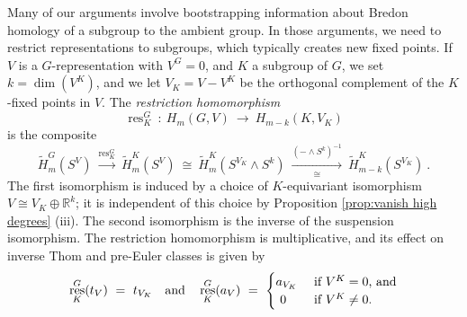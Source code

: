 \documentclass{amsart}[12pt]
\DeclareMathOperator{\res}{res}
\newcommand{\mR}{{\mathbb R}}
\newcommand{\iso}{\cong}
\newcommand{\sm}{\wedge}
\newcommand{\xra}{\xrightarrow}
\renewcommand{\to}{\longrightarrow}
\numberwithin{equation}{section}
\theoremstyle{definition}
\begin{document}
Many of our arguments involve bootstrapping information about Bredon homology
of a subgroup to the ambient group.
In those arguments, we need to restrict representations to subgroups,
which typically creates new fixed points.
If $V$ is a $G$-representation with $V^G=0$, and $K$ a subgroup of $G$, 
we set $k=\dim(V^K)$, and we let $V_K=V-V^K$ be the orthogonal complement
of the $K$-fixed points in $V$.
The {\em restriction homomorphism}
\[ \res^G_K \ : \ H_m(G,V)\ \to \ H_{m-k}(K,V_K) \]
is the composite
\[ \tilde H^G_m(S^V)\ \xra{\res^G_K} \
  \tilde H^K_m(S^V)\ \iso \
  \tilde H^K_m(S^{V_K}\sm S^k)\ \xra[\iso]{(-\sm S^k)^{-1}} \
  \tilde H^K_{m-k}(S^{V_K})\ . \]
The first isomorphism is induced by a choice of $K$-equivariant
isomorphism $V\iso V_K\oplus\mR^k$; it is independent of this choice by
Proposition \ref{prop:vanish high degrees} (iii).
The second isomorphism is the inverse of the suspension isomorphism.
The restriction homomorphism is multiplicative, and its effect
on inverse Thom and pre-Euler classes is given by
\[ \res^G_K(t_V)\ = \ t_{V_K} \text{\quad and\quad}
 \res^G_K(a_V)\ = \
  \begin{cases}
    a_{V_K} & \text{ if $V^K=0$, and}\\
    \ 0 & \text{ if $V^K\ne 0$.}
  \end{cases}
\]
\end{document}
